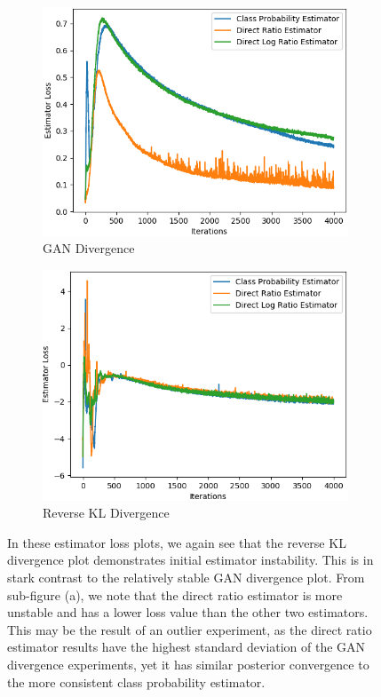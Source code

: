 \documentclass[honours,12pt]{unswthesis}
\numberwithin{equation}{section}
\theoremstyle{definition}
\begin{document}
\begin{figure}[h]
\begin{subfigure}{0.49\textwidth}
\includegraphics[width=\linewidth]{part2estimatorlosses/JCADVvsJCADVexpvsJCADVgudlog.png}
\caption{GAN Divergence}
\end{subfigure}
\begin{subfigure}{0.49\textwidth}
\includegraphics[width=\linewidth]{part2estimatorlosses/JCKLDvsJCKLexpvsJCKLgudlog.png}
\caption{Reverse KL Divergence}
\end{subfigure}
\caption{\small In these estimator loss plots, we again see that the reverse KL divergence plot demonstrates initial estimator instability. This is in stark contrast to the relatively stable GAN divergence plot. From sub-figure (a), we note that the direct ratio estimator is more unstable and has a lower loss value than the other two estimators. This may be the result of an outlier experiment, as the direct ratio estimator results have the highest standard deviation of the GAN divergence experiments, yet it has similar posterior convergence to the more consistent class probability estimator.}
\end{figure}
\end{document}
